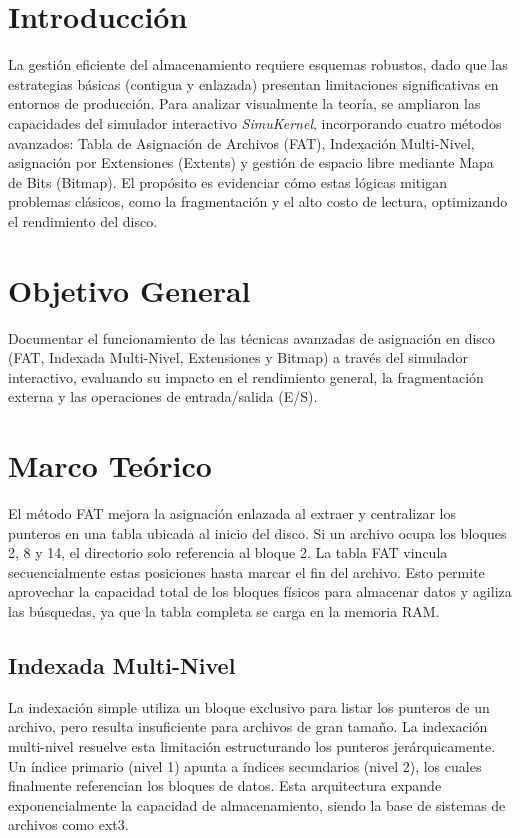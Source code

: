 \documentclass[12pt,a4paper]{article}
\begin{document}
\newpage
\doublespacing
\setlength{\parindent}{1.27cm}

\section{Introducción}
La gestión eficiente del almacenamiento requiere esquemas robustos, dado que las estrategias básicas (contigua y enlazada) presentan limitaciones significativas en entornos de producción. Para analizar visualmente la teoría, se ampliaron las capacidades del simulador interactivo \textit{SimuKernel}, incorporando cuatro métodos avanzados: Tabla de Asignación de Archivos (FAT), Indexación Multi-Nivel, asignación por Extensiones (Extents) y gestión de espacio libre mediante Mapa de Bits (Bitmap). El propósito es evidenciar cómo estas lógicas mitigan problemas clásicos, como la fragmentación y el alto costo de lectura, optimizando el rendimiento del disco.

\section{Objetivo General}
Documentar el funcionamiento de las técnicas avanzadas de asignación en disco (FAT, Indexada Multi-Nivel, Extensiones y Bitmap) a través del simulador interactivo, evaluando su impacto en el rendimiento general, la fragmentación externa y las operaciones de entrada/salida (E/S).

\section{Marco Teórico}
El método FAT mejora la asignación enlazada al extraer y centralizar los punteros en una tabla ubicada al inicio del disco. Si un archivo ocupa los bloques 2, 8 y 14, el directorio solo referencia al bloque 2. La tabla FAT vincula secuencialmente estas posiciones hasta marcar el fin del archivo. Esto permite aprovechar la capacidad total de los bloques físicos para almacenar datos y agiliza las búsquedas, ya que la tabla completa se carga en la memoria RAM.

\subsection{Indexada Multi-Nivel}
La indexación simple utiliza un bloque exclusivo para listar los punteros de un archivo, pero resulta insuficiente para archivos de gran tamaño. La indexación multi-nivel resuelve esta limitación estructurando los punteros jerárquicamente. Un índice primario (nivel 1) apunta a índices secundarios (nivel 2), los cuales finalmente referencian los bloques de datos. Esta arquitectura expande exponencialmente la capacidad de almacenamiento, siendo la base de sistemas de archivos como ext3.
\end{document}
